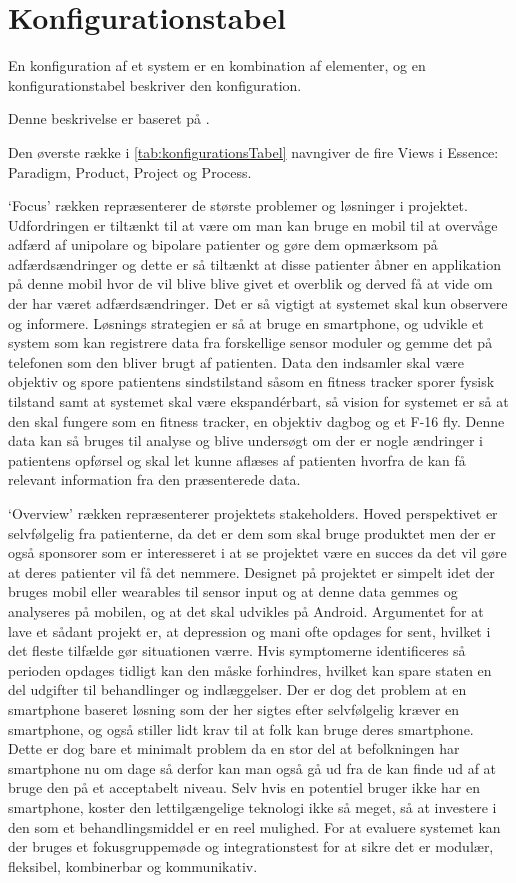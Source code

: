 \section{Konfigurationstabel}
En konfiguration af et system er en kombination af elementer, og en konfigurationstabel beskriver den konfiguration.

Denne beskrivelse er baseret på \citet[Afsnit 3.2, Side 16-21]{art:essence}.

Den øverste række i \cref{tab:konfigurationsTabel} navngiver de fire Views i Essence: Paradigm, Product, Project og Process.

`Focus' rækken repræsenterer de største problemer og løsninger i projektet. 
Udfordringen er tiltænkt til at være om man kan bruge en mobil til at overvåge adfærd af unipolare og bipolare patienter og gøre dem opmærksom på adfærdsændringer og dette er så tiltænkt at disse patienter åbner en applikation på denne mobil hvor de vil blive blive givet et overblik og derved få at vide om der har været adfærdsændringer. 
Det er så vigtigt at systemet skal kun observere og informere.
Løsnings strategien er så at bruge en smartphone, og udvikle et system som kan registrere data fra forskellige sensor moduler og gemme det på telefonen som den bliver brugt af patienten.
Data den indsamler skal være objektiv og spore patientens sindstilstand såsom en fitness tracker sporer fysisk tilstand samt at systemet skal være ekspandérbart, så vision for systemet er så at den skal fungere som en fitness tracker, en objektiv dagbog og et F-16 fly.
Denne data kan så bruges til analyse og blive undersøgt om der er nogle ændringer i patientens opførsel og skal let kunne aflæses af patienten hvorfra de kan få relevant information fra den præsenterede data. 

`Overview' rækken repræsenterer projektets stakeholders. Hoved perspektivet er selvfølgelig fra patienterne, da det er dem som skal bruge produktet men der er også sponsorer som er interesseret i at se projektet være en succes da det vil gøre at deres patienter vil få det nemmere. 
Designet på projektet er simpelt idet der bruges mobil eller wearables til sensor input og at denne data gemmes og analyseres på mobilen, og at det skal udvikles på Android.
Argumentet for at lave et sådant projekt er, at depression og mani ofte opdages for sent, hvilket i det fleste tilfælde gør situationen værre.
Hvis symptomerne identificeres så perioden opdages tidligt kan den måske forhindres, hvilket kan spare staten en del udgifter til behandlinger og indlæggelser.
Der er dog det problem at en smartphone baseret løsning som der her sigtes efter selvfølgelig kræver en smartphone, og også stiller lidt krav til at folk kan bruge deres smartphone.
Dette er dog bare et minimalt problem da en stor del at befolkningen har smartphone nu om dage så derfor kan man også gå ud fra de kan finde ud af at bruge den på et acceptabelt niveau.
Selv hvis en potentiel bruger ikke har en smartphone, koster den lettilgængelige teknologi ikke så meget, så at investere i den som et behandlingsmiddel er en reel mulighed.
For at evaluere systemet kan der bruges et fokusgruppemøde og integrationstest for at sikre det er modulær, fleksibel, kombinerbar og kommunikativ.

